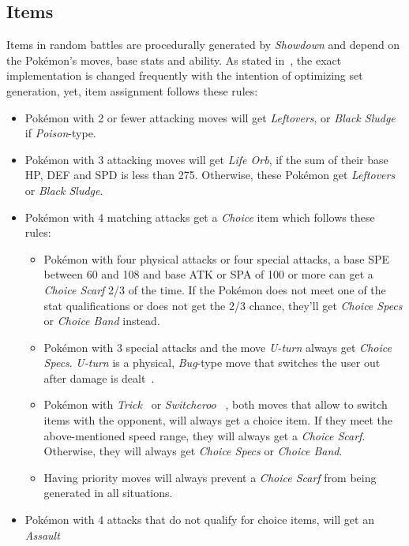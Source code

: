 \subsection{Items}
\label{sec:randbats-items}
Items in random battles are procedurally generated by \textit{Showdown} and depend on the Pokémon's
moves, base stats and ability. As stated in~\cite{Smogon:RandBatsGuide}, the exact implementation
is \grqq changed frequently with the intention of optimizing set generation\grqq, yet, item
assignment follows these rules:
\begin{itemize}
	\item Pokémon with 2 or fewer attacking moves will get \textit{Leftovers}, or 
	\textit{Black Sludge} if \textit{Poison}-type.
	\item Pokémon with 3 attacking moves will get \textit{Life Orb}, if the sum of their base
	\ac{HP}, \ac{DEF} and \ac{SPD} is less than 275. Otherwise, these Pokémon get 
	\textit{Leftovers} or \textit{Black Sludge}.
	\item Pokémon with 4 matching attacks get a \textit{Choice} item which follows these rules:
	\begin{itemize}
		\item Pokémon with four physical attacks or four special attacks, a base \ac{SPE} between
		60 and 108 and base \ac{ATK} or \ac{SPA} of 100 or more can get a \textit{Choice Scarf}
		2/3 of the time. If the Pokémon does not meet one of the stat qualifications or does not
		get the 2/3 chance, they'll get \textit{Choice Specs} or \textit{Choice Band} instead.
		\item Pokémon with 3 special attacks and the move \textit{U-turn} always get 
		\textit{Choice Specs}. \textit{U-turn} is a physical, \textit{Bug}-type move that 
		switches the user out after damage is dealt~\autocite{Bulbapedia:UTurn}.
		\item Pokémon with \textit{Trick}~\autocite{Bulbapedia:Trick} or \textit{Switcheroo} 
		~\autocite{Bulbapedia:Switcheroo}, both moves that allow to switch items
		with the opponent, will always get a choice item. If they meet the above-mentioned 
		speed range, they will always get a \textit{Choice Scarf}. Otherwise, they will always
		get \textit{Choice Specs} or \textit{Choice Band}.
		\item Having priority moves will always prevent a \textit{Choice Scarf} from being 
		generated in all situations.
	\end{itemize}
	\item Pokémon with 4 attacks that do not qualify for choice items, will get an \textit{Assault
}
\end{itemize}
